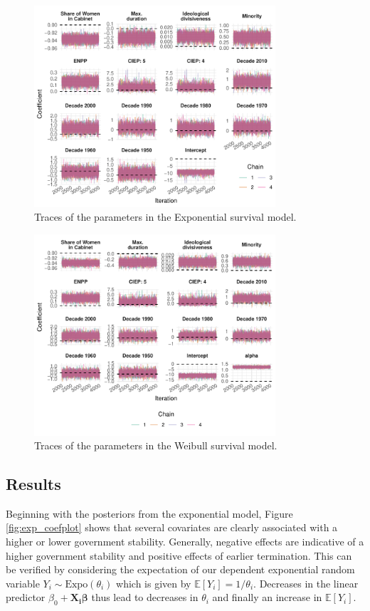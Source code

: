 \documentclass[11pt]{article}
\newcommand\minp[1]{\begin{minipage}{0.8\textwidth} #1 \end{minipage}}
\begin{document}
\begin{figure}[!ht]
    \centering
    \minp{\caption{Traces of the parameters in the Exponential survival model.} \label{fig:exp_convergence}}
    \includegraphics[width = 0.8\textwidth]{figures/fig2_exp_convergence.pdf}
\end{figure}

\begin{figure}
    \centering
    \minp{\caption{Traces of the parameters in the Weibull survival model.} \label{fig:weib_convergence}}
    \includegraphics[width = 0.8\textwidth]{figures/fig2_weib_convergence.pdf}
\end{figure}

\clearpage

\subsection{Results}
Beginning with the posteriors from the exponential model, Figure \ref{fig:exp_coefplot} shows that several covariates are clearly associated with a higher or lower government stability. Generally, negative effects are indicative of a higher government stability and positive effects of earlier termination. This can be verified by considering the expectation of our dependent exponential random variable $Y_i \sim \text{Expo}(\theta_i)$ which is given by $\mathbb{E}\left[Y_i\right] = 1/\theta_i$. Decreases in the linear predictor $\beta_0 + \bm{X_i\beta}$ thus lead to decreases in $\theta_i$ and finally an increase in  $\mathbb{E}\left[Y_i\right]$.
\end{document}
